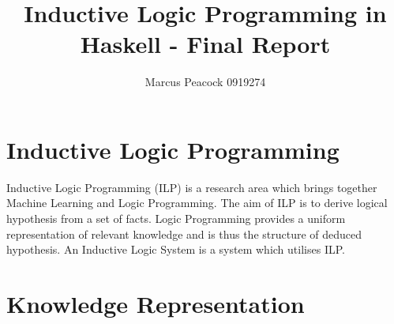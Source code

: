 \documentclass{article}
\title{Inductive Logic Programming in Haskell - Final Report}
\author{Marcus Peacock 0919274}
\begin{document}
\maketitle

\section{Inductive Logic Programming}

Inductive Logic Programming (ILP) is a research area which brings together Machine Learning and Logic Programming. The aim of ILP is to derive logical hypothesis from a set of facts. Logic Programming provides a uniform representation of relevant knowledge and is thus the structure of deduced hypothesis. An Inductive Logic System is a system which utilises ILP.

\section{Knowledge Representation}
\end{document}
